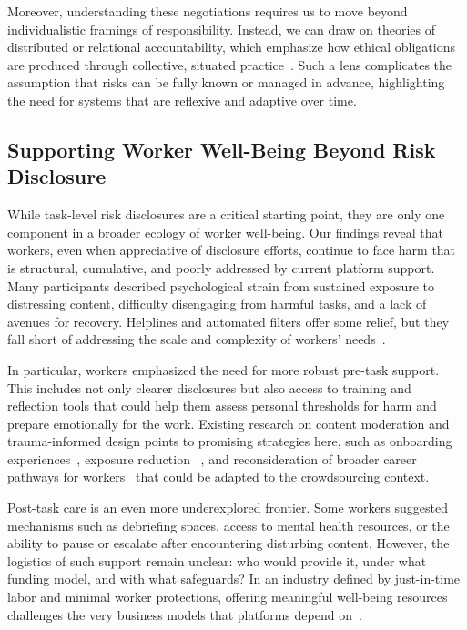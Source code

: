 Moreover, understanding these negotiations requires us to move beyond individualistic framings of responsibility. Instead, we can draw on theories of distributed or relational accountability, which emphasize how ethical obligations are produced through collective, situated practice~\cite{CooperAccountability2022}. Such a lens complicates the assumption that risks can be fully known or managed in advance, highlighting the need for systems that are reflexive and adaptive over time.


\subsection{Supporting Worker Well-Being Beyond Risk Disclosure}
While task-level risk disclosures are a critical starting point, they are only one component in a broader ecology of worker well-being. Our findings reveal that workers, even when appreciative of disclosure efforts, continue to face harm that is structural, cumulative, and poorly addressed by current platform support. Many participants described psychological strain from sustained exposure to distressing content, difficulty disengaging from harmful tasks, and a lack of avenues for recovery. Helplines and automated filters offer some relief, but they fall short of addressing the scale and complexity of workers’ needs~\cite{qian2025aura, spence2023content, steiger2022effects}.

In particular, workers emphasized the need for more robust pre-task support. This includes not only clearer disclosures but also access to training and reflection tools that could help them assess personal thresholds for harm and prepare emotionally for the work. Existing research on content moderation and trauma-informed design points to promising strategies here, such as onboarding experiences~\cite{steiger_psychological_2021, steiger2022effects}, exposure reduction ~\cite{dang_but_2018, das_fast_2020, Iyadurai2018PreventingIntrusiveMemories, holmes_can_2009}, and reconsideration of broader career pathways for workers~\cite{qian2025aura} that could be adapted to the crowdsourcing context.

Post-task care is an even more underexplored frontier. Some workers suggested mechanisms such as debriefing spaces, access to mental health resources, or the ability to pause or escalate after encountering disturbing content. However, the logistics of such support remain unclear: who would provide it, under what funding model, and with what safeguards? In an industry defined by just-in-time labor and minimal worker protections, offering meaningful well-being resources challenges the very business models that platforms depend on~\cite{gray2019ghost}.

